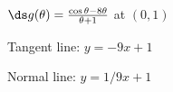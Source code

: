 {$\ds g(\theta) = \frac{\cos \theta - 8\theta}{\theta+1}$ at $(0,1)$
}
{Tangent line: $y = -9x+1$

Normal line: $y = 1/9x+1$
}
